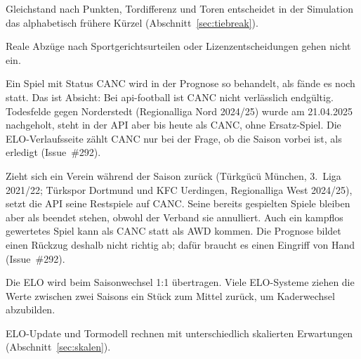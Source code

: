 \begin{description}[font=\sffamily\bfseries\small,style=nextline]
  \item[Kein direkter Vergleich]
        Gleichstand nach Punkten, Tordifferenz und Toren entscheidet in der
        Simulation das alphabetisch frühere Kürzel (Abschnitt~\ref{sec:tiebreak}).
  \item[Keine Punktabzüge]
        Reale Abzüge nach Sportgerichtsurteilen oder Lizenzentscheidungen
        gehen nicht ein.
  \item[Abgesagte Spiele werden simuliert]
        Ein Spiel mit Status CANC wird in der Prognose so behandelt, als
        fände es noch statt. Das ist Absicht: Bei api-football ist CANC
        nicht verlässlich endgültig. Todesfelde gegen Norderstedt
        (Regionalliga Nord 2024/25) wurde am 21.04.2025 nachgeholt, steht
        in der API aber bis heute als CANC, ohne Ersatz-Spiel. Die
        ELO-Verlaufsseite zählt CANC nur bei der Frage, ob die Saison
        vorbei ist, als erledigt (Issue~\#292).
  \item[Rückzug eines Vereins]
        Zieht sich ein Verein während der Saison zurück (Türkgücü München,
        3.~Liga 2021/22; Türkspor Dortmund und KFC Uerdingen, Regionalliga
        West 2024/25), setzt die API seine Restspiele auf CANC. Seine
        bereits gespielten Spiele bleiben aber als beendet stehen, obwohl
        der Verband sie annulliert. Auch ein kampflos gewertetes Spiel kann
        als CANC statt als AWD kommen. Die Prognose bildet einen Rückzug
        deshalb nicht richtig ab; dafür braucht es einen Eingriff von Hand
        (Issue~\#292).
  \item[Kein Rückgang zur Mitte]
        Die ELO wird beim Saisonwechsel 1:1 übertragen. Viele ELO-Systeme
        ziehen die Werte zwischen zwei Saisons ein Stück zum Mittel zurück,
        um Kaderwechsel abzubilden.
  \item[Zwei Erwartungsskalen]
        ELO-Update und Tormodell rechnen mit unterschiedlich skalierten
        Erwartungen (Abschnitt~\ref{sec:skalen}).
\end{description}
